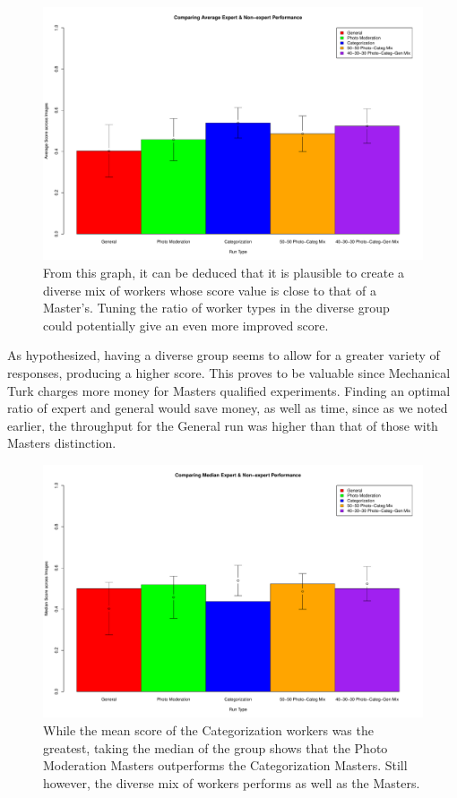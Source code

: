 \documentclass{chi2012}
\newcommand{\tab}{\hspace*{2em}}
\begin{document}
 \begin{figure}
\centering
\includegraphics[width=0.9\columnwidth]{averageScores}
\caption{From this graph, it can be deduced that it is plausible to create a diverse mix of workers whose score value is close to that of a Master's. Tuning the ratio of worker types in the diverse group could potentially give an even more improved score. }
\label{fig:figure1}
\end{figure} 

\tab As hypothesized, having a diverse group seems to allow for a greater variety of responses, producing a higher score. This proves to be valuable since Mechanical Turk charges more money for Masters qualified experiments. Finding an optimal ratio of expert and general would save money, as well as time, since as we noted earlier, the throughput for the General run was higher than that of those with Masters distinction.

 \begin{figure}
\centering
\includegraphics[width=0.9\columnwidth]{medianScores}
\caption{While the mean score of the Categorization workers was the greatest, taking the median of the group shows that the Photo Moderation Masters outperforms the Categorization Masters. Still however, the diverse mix of workers performs as well as the Masters.}
\label{fig:figure1}
\end{figure} 
\end{document}
